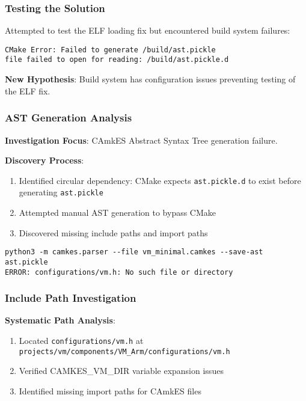 \documentclass[11pt,a4paper]{article}
\begin{document}
\subsubsection{Testing the Solution}

Attempted to test the ELF loading fix but encountered build system failures:

\begin{lstlisting}[caption=Build System Error]
CMake Error: Failed to generate /build/ast.pickle
file failed to open for reading: /build/ast.pickle.d
\end{lstlisting}

\textbf{New Hypothesis}: Build system has configuration issues preventing testing of the ELF fix.

\subsubsection{AST Generation Analysis}

\textbf{Investigation Focus}: CAmkES Abstract Syntax Tree generation failure.

\textbf{Discovery Process}:
\begin{enumerate}
\item Identified circular dependency: CMake expects \texttt{ast.pickle.d} to exist before generating \texttt{ast.pickle}
\item Attempted manual AST generation to bypass CMake
\item Discovered missing include paths and import paths
\end{enumerate}

\begin{lstlisting}[caption=Manual AST Generation Attempt]
python3 -m camkes.parser --file vm_minimal.camkes --save-ast ast.pickle
ERROR: configurations/vm.h: No such file or directory
\end{lstlisting}

\subsubsection{Include Path Investigation}

\textbf{Systematic Path Analysis}:
\begin{enumerate}
\item Located \texttt{configurations/vm.h} at \texttt{projects/vm/components/VM\_Arm/configurations/vm.h}
\item Verified CAMKES\_VM\_DIR variable expansion issues
\item Identified missing import paths for CAmkES files
\end{enumerate}
\end{document}
